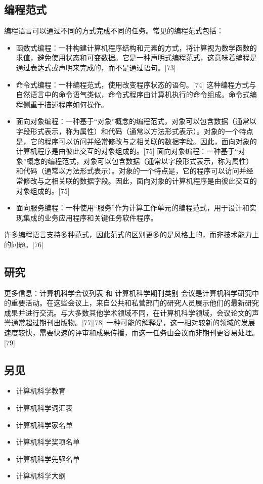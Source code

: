 \subsection{编程范式}   
编程语言可以通过不同的方式完成不同的任务。常见的编程范式包括：
\begin{itemize}
\item 函数式编程：一种构建计算机程序结构和元素的方式，将计算视为数学函数的求值，避免使用状态和可变数据。它是一种声明式编程范式，这意味着编程是通过表达式或声明来完成的，而不是通过语句。[73]     
\item 命令式编程：一种编程范式，使用改变程序状态的语句。[74] 这种编程方式与自然语言中的命令语气类似，命令式程序由计算机执行的命令组成。命令式编程侧重于描述程序如何操作。
\item 面向对象编程：一种基于“对象”概念的编程范式，对象可以包含数据（通常以字段形式表示，称为属性）和代码（通常以方法形式表示）。对象的一个特点是，它的程序可以访问并经常修改与之相关联的数据字段。因此，面向对象的计算机程序是由彼此交互的对象组成的。[75]  
面向对象编程：一种基于“对象”概念的编程范式，对象可以包含数据（通常以字段形式表示，称为属性）和代码（通常以方法形式表示）。对象的一个特点是，它的程序可以访问并经常修改与之相关联的数据字段。因此，面向对象的计算机程序是由彼此交互的对象组成的。[75]  
\item 面向服务编程：一种使用“服务”作为计算工作单元的编程范式，用于设计和实现集成的业务应用程序和关键任务软件程序。
\end{itemize}  
许多编程语言支持多种范式，因此范式的区别更多的是风格上的，而非技术能力上的问题。[76]
\subsection{研究}  
更多信息：计算机科学会议列表 和 计算机科学期刊类别  
会议是计算机科学研究中的重要活动。在这些会议上，来自公共和私营部门的研究人员展示他们的最新研究成果并进行交流。与大多数其他学术领域不同，在计算机科学领域，会议论文的声誉通常超过期刊出版物。[77][78] 一种可能的解释是，这一相对较新的领域的发展速度较快，需要快速的评审和成果传播，而这一任务由会议而非期刊更容易处理。[79]
\subsection{另见}  
\begin{itemize}
\item 计算机科学教育  
\item 计算机科学词汇表  
\item 计算机科学家名单  
\item 计算机科学奖项名单  
\item 计算机科学先驱名单  
\item 计算机科学大纲
\end{itemize}
